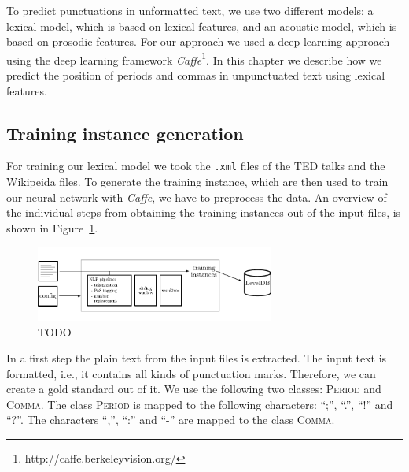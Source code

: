 To predict punctuations in unformatted text, we use two different models: a lexical model, which is based on lexical features, and an acoustic model, which is based on prosodic features.
For our approach we used a deep learning approach using the deep learning framework \emph{Caffe}\footnote{http://caffe.berkeleyvision.org/}. 
In this chapter we describe how we predict the position of periods and commas in unpunctuated text using lexical features.

\subsection{Training instance generation}
For training our lexical model we took the \texttt{.xml} files of the TED talks and the Wikipeida files.
To generate the training instance, which are then used to train our neural network with \emph{Caffe}, we have to preprocess the data.
An overview of the individual steps from obtaining the training instances out of the input files, is shown in Figure~\ref{fig:overview_lexical}.
\begin{figure}[ht]
    \centering
    \includegraphics[width=0.7\textwidth]{img/overview_lexical.pdf}
    \caption{TODO}
    \label{fig:overview_lexical}
\end{figure}

In a first step the plain text from the input files is extracted.
The input text is formatted, i.e., it contains all kinds of punctuation marks.
Therefore, we can create a gold standard out of it.
We use the following two classes: \textsc{Period} and \textsc{Comma}.
The class \textsc{Period} is mapped to the following characters: ``;'', ``.'', ``!'' and ``?''.
The characters ``,'', ``:'' and ``-'' are mapped to the class \textsc{Comma}.

